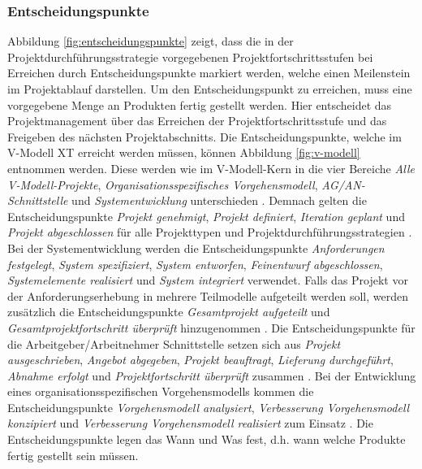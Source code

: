  \subsubsection{Entscheidungspunkte}
Abbildung \ref{fig:entscheidungspunkte} zeigt, dass die in der Projektdurchführungsstrategie vorgegebenen Projektfortschrittsstufen bei Erreichen durch Entscheidungspunkte markiert werden, welche einen Meilenstein im Projektablauf darstellen. Um den Entscheidungspunkt zu erreichen, muss eine vorgegebene Menge an Produkten fertig gestellt werden. Hier entscheidet das Projektmanagement über das Erreichen der Projektfortschrittsstufe und das Freigeben des nächsten Projektabschnitts. Die Entscheidungspunkte, welche im V-Modell XT erreicht werden müssen, können Abbildung \ref{fig:v-modell} entnommen werden. Diese werden wie im V-Modell-Kern in die vier Bereiche \textit{Alle V-Modell-Projekte}, \textit{Organisationsspezifisches Vorgehensmodell}, \textit{AG/AN-Schnittstelle} und \textit{Systementwicklung} unterschieden \cite{2004vmodell}. \newline
Demnach gelten die Entscheidungspunkte \textit{Projekt genehmigt}, \textit{Projekt definiert}, \textit{Iteration geplant} und \textit{Projekt abgeschlossen} für alle Projekttypen und Projektdurchführungsstrategien \cite{2004vmodell}. \newline
Bei der Systementwicklung werden die Entscheidungspunkte \textit{Anforderungen festgelegt}, \textit{System spezifiziert}, \textit{System entworfen}, \textit{Feinentwurf abgeschlossen}, \textit{Systemelemente realisiert} und \textit{System integriert} verwendet. Falls das Projekt vor der Anforderungserhebung in mehrere Teilmodelle aufgeteilt werden soll, werden zusätzlich die Entscheidungspunkte \textit{Gesamtprojekt aufgeteilt} und \textit{Gesamtprojektfortschritt überprüft} hinzugenommen \cite{2004vmodell}. \newline
Die Entscheidungspunkte für die Arbeitgeber/Arbeitnehmer Schnittstelle setzen sich aus \textit{Projekt ausgeschrieben}, \textit{Angebot abgegeben}, \textit{Projekt beauftragt}, \textit{Lieferung durchgeführt}, \textit{Abnahme erfolgt} und \textit{Projektfortschritt überprüft} zusammen \cite{2004vmodell}. \newline
 Bei der Entwicklung eines organisationsspezifischen Vorgehensmodells kommen die Entscheidungspunkte \textit{Vorgehensmodell analysiert}, \textit{Verbesserung Vorgehensmodell konzipiert} und \textit{Verbesserung Vorgehensmodell realisiert} zum Einsatz \cite{2004vmodell}. \newline
 Die Entscheidungspunkte legen das \grqq Wann\grqq {} und \grqq Was\grqq {} fest, d.h. wann welche Produkte fertig gestellt sein müssen.

